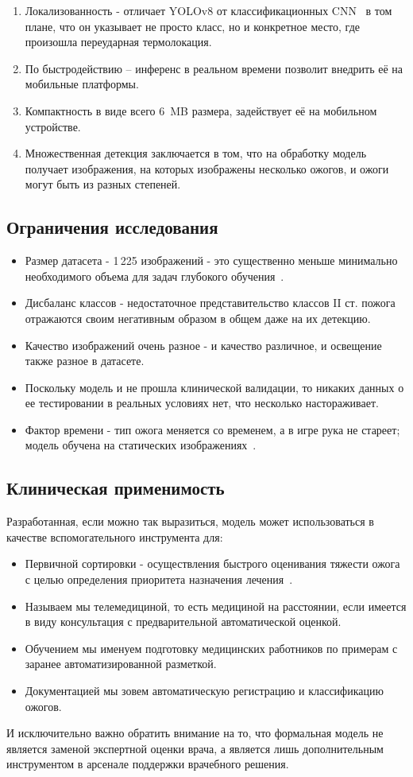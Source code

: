 \begin{enumerate}
\item Локализованность - отличает YOLOv8 от классификационных CNN~\cite{he2016resnet,simonyan2014vgg} в том плане, что он указывает не просто класс, но и конкретное место, где произошла переударная термолокация.
\item По быстродействию – инференс в реальном времени позволит внедрить её на мобильные платформы.
\item Компактность в виде всего 6~MB размера, задействует её на мобильном устройстве.
\item Множественная детекция заключается в том, что на обработку модель получает изображения, на которых изображены несколько ожогов, и ожоги могут быть из разных степеней.
\end{enumerate}

\subsection{Ограничения исследования}

\begin{itemize}
\item Размер датасета - 1\,225 изображений - это существенно меньше минимально необходимого объема для задач глубокого обучения~\cite{shorten2019augmentation}.
\item Дисбаланс классов - недостаточное представительство классов II ст. пожога отражаются своим негативным образом в общем даже на их детекцию.
\item Качество изображений очень разное - и качество различное, и освещение также разное в датасете.
\item Поскольку модель и не прошла клинической валидации, то никаких данных о ее тестировании в реальных условиях нет, что несколько настораживает.
\item Фактор времени - тип ожога меняется со временем, а в игре рука не стареет; модель обучена на статических изображениях~\cite{hoeksema2009accuracy}.
\end{itemize}

\subsection{Клиническая применимость}

Разработанная, если можно так выразиться, модель может использоваться в качестве вспомогательного инструмента для:

\begin{itemize}
\item Первичной сортировки - осуществления быстрого оценивания тяжести ожога с целью определения приоритета назначения лечения~\cite{peck2012burns}. \item Называем мы телемедициной, то есть медициной на расстоянии, если имеется в виду консультация с предварительной автоматической оценкой.
\item Обучением мы именуем подготовку медицинских работников по примерам с заранее автоматизированной разметкой.
\item Документацией мы зовем автоматическую регистрацию и классификацию ожогов.
\end{itemize}

И исключительно важно обратить внимание на то, что формальная модель не является заменой экспертной оценки врача, а является лишь дополнительным инструментом в арсенале поддержки врачебного решения.